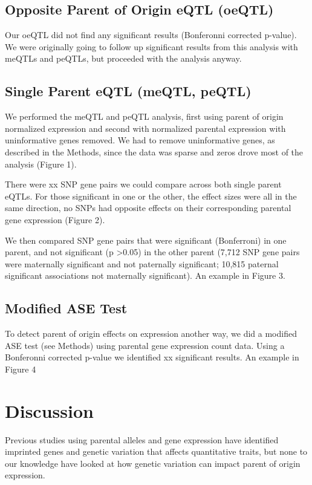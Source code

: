 \subsection{Opposite Parent of Origin eQTL (oeQTL) }\label{Opposite Parent of Origin eQTL (oeQTL)} 
Our oeQTL did not find any significant results (Bonferonni corrected p-value). We were originally going to follow up significant results from this analysis with meQTLs and peQTLs, but proceeded with the analysis anyway.

\subsection{Single Parent eQTL (meQTL, peQTL)}\label{Single Parent eQTL (meQTL, peQTL)} 
We performed the meQTL and peQTL analysis, first using parent of origin normalized expression and second with normalized parental expression with uninformative genes removed. We had to remove uninformative genes, as described in the Methods, since the data was sparse and zeros drove most of the analysis (Figure 1). 

There were xx SNP gene pairs we could compare across both single parent eQTLs. For those significant in one or the other, the effect sizes were all in the same direction, no SNPs had opposite effects on their corresponding parental gene expression (Figure 2).

We then compared SNP gene pairs that were significant (Bonferroni) in one parent, and not significant (p >0.05) in the other parent (7,712 SNP gene pairs were maternally significant and not paternally significant; 10,815 paternal significant associations not maternally significant). An example in Figure 3. 


\subsection{Modified ASE Test}\label{Modified ASE Test} 

To detect parent of origin effects on expression another way, we did a modified ASE test (see Methods) using parental gene expression count data. Using a Bonferonni corrected p-value we identified xx significant results. An example in Figure 4 


\section{Discussion}\label{ch04-discussion}

Previous studies using parental alleles and gene expression have identified imprinted genes and genetic variation that affects quantitative traits\cite{Zoledziewska:2015do,Baran:2015cx,Benonisdottir:2016dz,Garg2012a}, but none to our knowledge have looked at how genetic variation can impact parent of origin expression.


